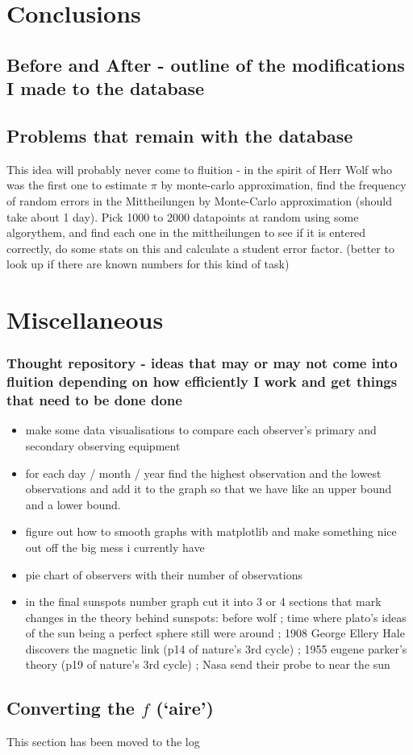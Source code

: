 \documentclass[12pt]{article}
\begin{document}
\section{Conclusions}

\subsection{Before and After - outline of the modifications I made to the database}

\subsection{Problems that remain with the database}

This idea will probably never come to fluition - in the spirit of Herr Wolf who was the first one to estimate $\pi$ by monte-carlo approximation, find the frequency of random errors in the Mittheilungen by Monte-Carlo approximation (should take about 1 day). Pick 1000 to 2000 datapoints at random using some algorythem, and find each one in the mittheilungen to see if it is entered correctly, do some stats on this and calculate a student error factor. (better to look up if there are known numbers for this kind of task)

\section{Miscellaneous}

\subsubsection{Thought repository - ideas that may or may not come into fluition depending on how efficiently I work and get things that need to be done done}
\begin{itemize}
    \item make some data visualisations to compare each observer's primary and secondary observing equipment
    \item for each day / month / year find the highest observation and the lowest observations and add it to the graph so that we have like an upper bound and a lower bound. 
    \item figure out how to smooth graphs with matplotlib and make something nice out off the big mess i currently have
    \item pie chart of observers with their number of observations
    \item in the final sunspots number graph cut it into 3 or 4 sections that mark changes in the theory behind sunspots: before wolf ; time where plato's ideas of the sun being a perfect sphere still were around ; 1908 George Ellery Hale discovers the magnetic link (p14 of nature's 3rd cycle) ; 1955 eugene parker's theory (p19 of nature's 3rd cycle) ; Nasa send their probe to near the sun
\end{itemize}

\subsection{Converting the $f$ (`aire')}\label{converting the `aire'}
This section has been moved to the log
\end{document}
